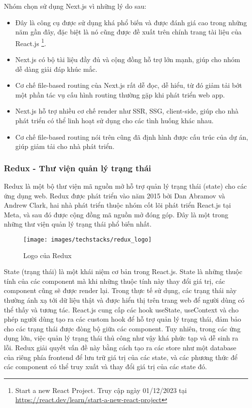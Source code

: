 \documentclass[../main.tex]{subfiles}
\begin{document}
	Nhóm chọn sử dụng Next.js vì những lý do sau:

	\begin{itemize}
		\item Đây là công cụ được sử dụng khá phổ biến và được đánh giá cao trong những năm gần đây, đặc biệt là nó cũng
		được đề xuất trên chính trang tài liệu của React.js \footnote{Start a new React Project. Truy cập ngày 01/12/2023
		tại \url{https://react.dev/learn/start-a-new-react-project}}.
		\item Next.js có bộ tài liệu đầy đủ và cộng đồng hỗ trợ lớn mạnh, giúp cho nhóm dễ dàng giải đáp khúc mắc.
		\item Cơ chế file-based routing của Next.js rất dễ đọc, dễ hiểu, từ đó giảm tải bớt một phần tác vụ cấu hình routing
		thường gặp khi phát triển web app.
		\item Next.js hỗ trợ nhiều cơ chế render như SSR, SSG, client-side, giúp cho nhà phát triển có thể linh hoạt sử dụng
		cho các tình huống khác nhau.
		\item Cơ chế file-based routing nói trên cũng đã định hình được cấu trúc của dự án, giúp giảm tải cho nhà phát
		triển.
	\end{itemize}

	\subsubsection{Redux - Thư viện quản lý trạng thái}

	Redux là một bộ thư viện mã nguồn mở hỗ trợ quản lý trạng thái (state) cho các ứng dụng web. Redux được phát triển vào
	năm 2015 bởi Dan Abramov và Andrew Clark, hai nhà phát triển thuộc nhóm cốt lõi phát triển React.js tại Meta, và sau
	đó được cộng đồng mã nguồn mở đóng góp. Đây là một trong những thư viện quản lý trạng thái phổ biến nhất.

	\begin{figure}[ht]
		\centering
		\texttt{[image: images/techstacks/redux\_logo]}
		\caption{Logo của Redux}
		\label{fig:redux-logo}
	\end{figure}

	State (trạng thái) là một khái niệm cơ bản trong React.js. State là những thuộc tính của các component mà khi những
	thuộc tính này thay đổi giá trị, các component cũng sẽ được render lại. Trong thực tế sử dụng, các trạng thái này
	thường ánh xạ tới dữ liệu thật và được hiển thị trên trang web để người dùng có thể thấy và tương tác. React.js cung
	cấp các hook useState, useContext và cho phép người dùng tạo ra các custom hook để hỗ trợ quản lý trạng thái, đảm bảo
	cho các trạng thái được đòng bộ giữa các component. Tuy nhiên, trong các ứng dụng lớn, việc quản lý trạng thái thủ
	công như vậy khá phức tạp và dễ sinh ra lỗi. Redux giải quyết vấn đề này bằng cách tạo ra các store như một database
	của riêng phía \Gls{frontend} để lưu trữ giá trị của các state, và các phương thức để các component có thể truy xuất
	và thay đổi giá trị của các state đó.
\end{document}
